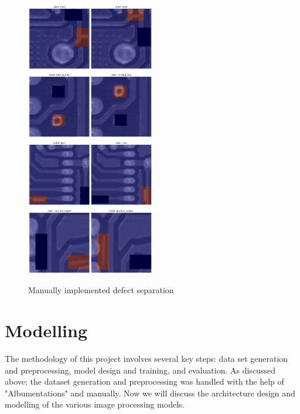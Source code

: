 \documentclass[12pt]{article}
\begin{document}
\begin{figure}[h]
    \centering
    \includegraphics[width=0.5\textwidth]{./graphics/separated_img1.png}
    \includegraphics[width=0.5\textwidth]{./graphics/separated_img3.png}
    \includegraphics[width=0.5\textwidth]{./graphics/separated_img4.png}
    \includegraphics[width=0.5\textwidth]{./graphics/separated_img5.png}
    \caption{Manually implemented defect separation}
    \label{fig:defect_separation}
\end{figure}

\clearpage
\newpage

\section{Modelling}
The methodology of this project involves several key steps: data set generation and preprocessing, model design and training, and evaluation. As discussed above; the dataset generation and preprocessing was handled with the help of "Albumentations" and manually. Now we will discuss the architecture design and modelling of the various image processing models.
\end{document}
